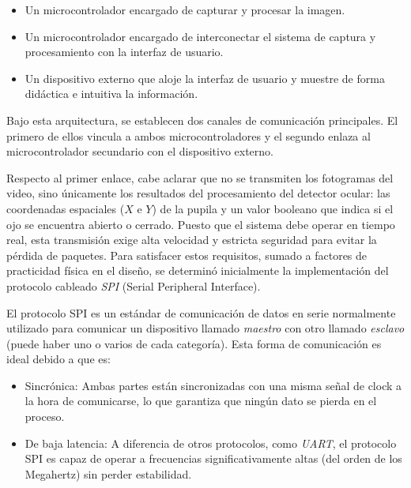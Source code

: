 \begin{itemize}

\item Un microcontrolador encargado de capturar y procesar la imagen.

\item Un microcontrolador encargado de interconectar el sistema de captura y procesamiento con la interfaz de usuario.

\item Un dispositivo externo que aloje la interfaz de usuario y muestre de forma didáctica e intuitiva la información.

\end{itemize}

Bajo esta arquitectura, se establecen dos canales de comunicación principales. El primero de ellos vincula a ambos microcontroladores y el segundo enlaza al microcontrolador secundario con el dispositivo externo. 

Respecto al primer enlace, cabe aclarar que no se transmiten los fotogramas del video, sino únicamente los resultados del procesamiento del detector ocular: las coordenadas espaciales ($X$ e $Y$) de la pupila y un valor booleano que indica si el ojo se encuentra abierto o cerrado. Puesto que el sistema debe operar en tiempo real, esta transmisión exige alta velocidad y estricta seguridad para evitar la pérdida de paquetes. Para satisfacer estos requisitos, sumado a factores de practicidad física en el diseño, se determinó inicialmente la implementación del protocolo cableado \emph{SPI} (Serial Peripheral Interface). 

El protocolo SPI es un estándar de comunicación de datos en serie normalmente utilizado para comunicar un dispositivo llamado \emph{maestro} con otro llamado \emph{esclavo} (puede haber uno o varios de cada categoría). Esta forma de comunicación es ideal debido a que es:

\begin{itemize}

\item Sincrónica: Ambas partes están sincronizadas con una misma señal de clock a la hora de comunicarse, lo que garantiza que ningún dato se pierda en el proceso.

\item De baja latencia: A diferencia de otros protocolos, como \emph{UART}, el protocolo SPI es capaz de operar a frecuencias significativamente altas (del orden de los Megahertz) sin perder estabilidad.

\end{itemize}

